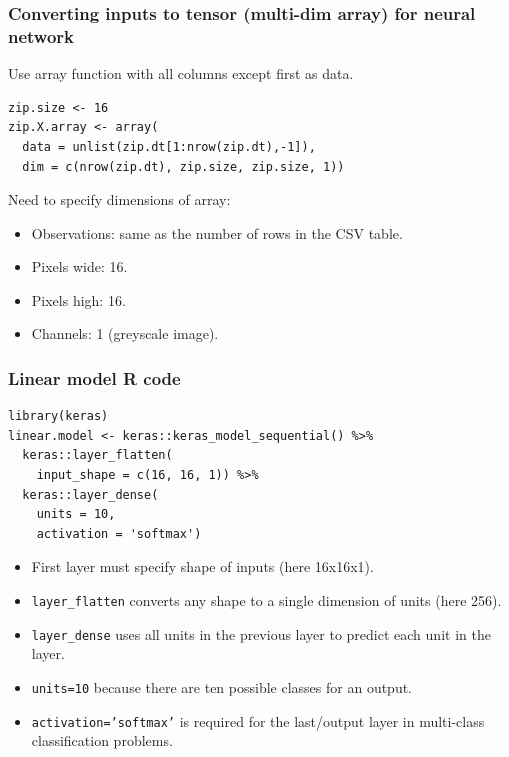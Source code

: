 \documentclass{beamer}
\begin{document}
\begin{frame}[fragile]
  \frametitle{Converting inputs to tensor (multi-dim array) for neural network}
Use array function with all columns except first as data.  
\begin{verbatim}
zip.size <- 16
zip.X.array <- array(
  data = unlist(zip.dt[1:nrow(zip.dt),-1]),
  dim = c(nrow(zip.dt), zip.size, zip.size, 1))
\end{verbatim}
Need to specify dimensions of array:
\begin{itemize}
\item Observations: same as the number of rows in the CSV table.
\item Pixels wide: 16.
\item Pixels high: 16.
\item Channels: 1 (greyscale image).
\end{itemize}

\end{frame}

\begin{frame}[fragile]
  \frametitle{Linear model R code}

\begin{verbatim}
library(keras)
linear.model <- keras::keras_model_sequential() %>%
  keras::layer_flatten(
    input_shape = c(16, 16, 1)) %>%
  keras::layer_dense(
    units = 10,
    activation = 'softmax')
\end{verbatim}

  \begin{itemize}
  \item First layer must specify shape of inputs (here 16x16x1).
  \item \texttt{layer\_flatten} converts any shape to a single dimension
    of units (here 256).
  \item \texttt{layer\_dense} uses all units in the previous layer to
    predict each unit in the layer.
  \item \texttt{units=10} because there are ten possible classes for an output.
  \item \texttt{activation='softmax'} is required for the last/output layer in
    multi-class classification problems.
  \end{itemize}

\end{frame}
\end{document}
